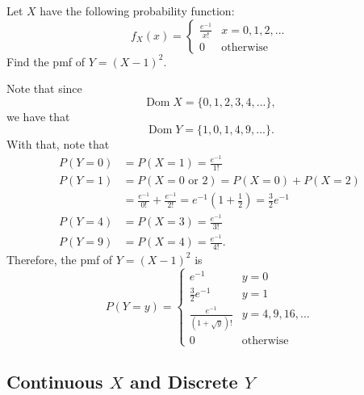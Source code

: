 \documentclass[notoc,notitlepage]{tufte-book}
\DeclareMathOperator{\Dom}{Dom }
\begin{document}
\begin{ex}
  Let $X$ have the following probability function:
  \begin{equation*}
    f_X (x) = \begin{cases}
      \frac{e^{-1}}{x!} & x = 0, 1, 2, ... \\
      0                 & \text{otherwise}
    \end{cases}
  \end{equation*}
  Find the pmf of $Y = (X - 1)^2$.
  
  \begin{solution}
    Note that since
    \begin{equation*}
      \Dom X = \{0, 1, 2, 3, 4, ...\},
    \end{equation*}
    we have that
    \begin{equation*}
      \Dom Y = \{1, 0, 1, 4, 9, ...\}.
    \end{equation*}
    With that, note that
    \begin{align*}
      P(Y = 0) &= P(X = 1) = \frac{e^{-1}}{1!} \\
      P(Y = 1) &= P(X = 0 \text{ or } 2) = P(X = 0) + P(X = 2) \\
               &= \frac{e^{-1}}{0!} + \frac{e^{-1}}{2!}
                = e^{-1} \left( 1 + \frac{1}{2} \right) = \frac{3}{2} e^{-1} \\
      P(Y = 4) &= P(X = 3) = \frac{e^{-1}}{3!} \\
      P(Y = 9) &= P(X = 4) = \frac{e^{-1}}{4!}.
    \end{align*}
    Therefore, the pmf of $Y = (X - 1)^2$ is
    \begin{equation*}
      P(Y = y) = \begin{cases}
        e^{-1}                         & y = 0 \\
        \frac{3}{2} e^{-1}             & y = 1 \\
        \frac{e^{-1}}{(1 + \sqrt{y})!} & y = 4, 9, 16, ... \\
        0                              & \text{otherwise}
      \end{cases}
    \end{equation*}
  \end{solution}
\end{ex}


\subsection{Continuous $X$ and Discrete $Y$}%
\label{sub:continuous_x_and_discrete_y}
\end{document}
